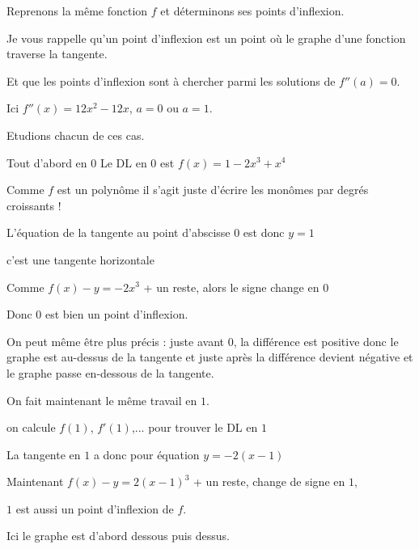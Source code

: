 \diapo

Reprenons la même fonction $f$ et déterminons ses points d'inflexion.


Je vous rappelle qu'un point d'inflexion est un point où le graphe d'une fonction
traverse la tangente.

\change

Et que les points d'inflexion sont à chercher parmi les solutions de $f''(a)=0$. 

\change

Ici $f''(x)=12x^2-12x$,  $a=0$ ou $a=1$. 

Etudions chacun de ces cas.


\change

Tout d'abord en $0$
Le DL en $0$ est $f(x)= 1-2x^3+x^4$ 

Comme $f$ est un polynôme il s'agit juste 
d'écrire les monômes par degrés croissants !

\change

L'équation de la tangente au point d'abscisse $0$ est donc $y=1$ 

c'est une tangente horizontale

\change


Comme $f(x)-y=-2x^3$ + un reste,  alors le signe change en $0$ 

\change

Donc $0$ est bien un point d'inflexion. 

On peut même être plus précis : juste avant $0$, la différence est positive donc le graphe est au-dessus de la tangente
et juste après la différence devient négative et le graphe passe en-dessous de la tangente.

\change

On fait maintenant le même travail en $1$.

on calcule $f(1)$, $f'(1)$,...
pour trouver le DL en $1$

\change

La tangente en $1$ a donc pour équation $y=-2(x-1)$

\change

Maintenant $f(x)-y = 2(x-1)^3$ + un reste, change de signe en $1$, 

\change

$1$ est aussi un point d'inflexion de $f$. 

Ici le graphe est d'abord dessous puis dessus.

\diapo

